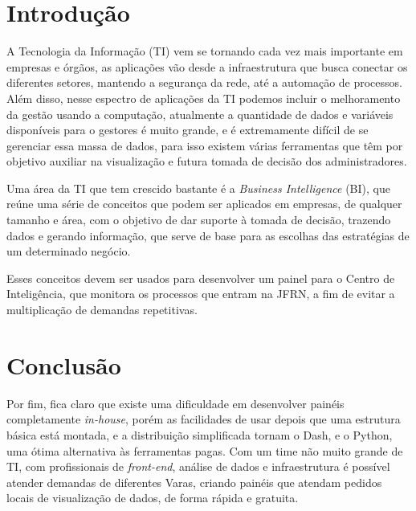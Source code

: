 \chapter*{Introdução}

A Tecnologia da Informação (TI) vem se tornando cada vez mais importante em empresas e órgãos, as aplicações vão desde a infraestrutura que busca conectar os diferentes setores, mantendo a segurança da rede, até a automação de processos. Além disso, nesse espectro de aplicações da TI podemos incluir o melhoramento da gestão usando a computação, atualmente a quantidade de dados e variáveis disponíveis para o gestores é muito grande, e é extremamente difícil de se gerenciar essa massa de dados, para isso existem várias ferramentas que têm por objetivo auxiliar na visualização e futura tomada de decisão dos administradores.

Uma área da TI que tem crescido bastante é a \textit{Business Intelligence} (BI), que reúne uma série de conceitos que podem ser aplicados em empresas, de qualquer tamanho e área, com o objetivo de dar suporte à tomada de decisão, trazendo dados e gerando informação, que serve de base para as escolhas das estratégias de um determinado negócio. \cite{teste}

Esses conceitos devem ser usados para desenvolver um painel para o Centro de Inteligência, que monitora os processos que entram na JFRN, a fim de evitar a multiplicação de demandas repetitivas.



%






\chapter{Conclusão}
Por fim, fica claro que existe uma dificuldade em desenvolver painéis completamente \textit{in-house}, porém as facilidades de usar depois que uma estrutura básica está montada, e a distribuição simplificada tornam o Dash, e o Python, uma ótima alternativa às ferramentas pagas. Com um time não muito grande de TI, com profissionais de \textit{front-end}, análise de dados e infraestrutura é possível atender demandas de diferentes Varas, criando painéis que atendam pedidos locais de visualização de dados, de forma rápida e gratuita.